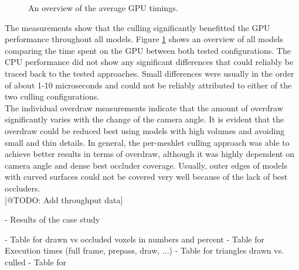 \begin{figure}    %
  \centering
  \caption{An overview of the average \ac{GPU} timings.}
  \label{fig:gpu-performance-overview}
\end{figure}

\noindent
The measurements show that the culling significantly benefitted the \ac{GPU} performance throughout all 
models. Figure \ref{fig:gpu-performance-overview} shows an overview of all models comparing the time spent 
on the \ac{GPU} between both tested configurations. The \ac{CPU} performance did not show any significant 
differences that could reliably be traced back to the tested approaches. Small differences were usually in the 
order of about 1-10 microseconds and could not be reliably attributed to either of the two culling 
configurations. \\


\noindent
The individual overdraw measurements indicate that the amount of overdraw significantly varies with the 
change of the camera angle. It is evident that the overdraw could be reduced best using models with high 
volumes and avoiding small and thin details. In general, the per-meshlet culling approach was able to 
achieve better results in terms of overdraw, although it was highly dependent on camera angle and dense 
best occluder coverage. Usually, outer edges of models with curved surfaces could not be covered very well 
because of the lack of best occluders.\\



[@TODO: Add throughput data]







- Results of the case study

- Table for drawn vs occluded voxels in numbers and percent
- Table for Execution times (full frame, prepass, draw, ...)
- Table for triangles drawn vs. culled 
- Table for 
